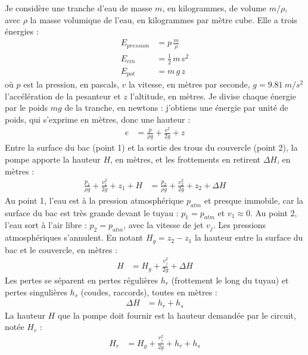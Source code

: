 \begin{demonstration}
Je considère une tranche d'eau de masse $m$, en kilogrammes, de volume $m/\rho$, avec $\rho$ la masse volumique de l'eau, en kilogrammes par mètre cube. Elle a trois énergies :
\begin{align*}
E_{pression} &= p\,\frac{m}{\rho}\\
E_{cin} &= \frac{1}{2}\,m\,v^2\\
E_{pot} &= m\,g\,z
\end{align*}
où $p$ est la pression, en pascals, $v$ la vitesse, en mètres par seconde, $g = \qty{9,81}{m/s^2}$ l'accélération de la pesanteur et $z$ l'altitude, en mètres. Je divise chaque énergie par le poids $m g$ de la tranche, en newtons : j'obtiens une énergie par unité de poids, qui s'exprime en mètres, donc une hauteur :
\begin{align*}
e &= \frac{p}{\rho g} + \frac{v^2}{2g} + z
\end{align*}
Entre la surface du bac (point 1) et la sortie des trous du couvercle (point 2), la pompe apporte la hauteur $H$, en mètres, et les frottements en retirent $\Delta H$, en mètres :
\begin{align*}
\frac{p_1}{\rho g} + \frac{v_1^2}{2g} + z_1 + H &= \frac{p_2}{\rho g} + \frac{v_2^2}{2g} + z_2 + \Delta H
\end{align*}
Au point 1, l'eau est à la pression atmosphérique $p_{atm}$ et presque immobile, car la surface du bac est très grande devant le tuyau : $p_1 = p_{atm}$ et $v_1 \approx 0$. Au point 2, l'eau sort à l'air libre : $p_2 = p_{atm}$, avec la vitesse de jet $v_j$. Les pressions atmosphériques s'annulent. En notant $H_g = z_2 - z_1$ la hauteur entre la surface du bac et le couvercle, en mètres :
\begin{align*}
H &= H_g + \frac{v_j^2}{2g} + \Delta H
\end{align*}
Les pertes se séparent en pertes régulières $h_r$ (frottement le long du tuyau) et pertes singulières $h_s$ (coudes, raccords), toutes en mètres :
\begin{align*}
\Delta H &= h_r + h_s
\end{align*}
La hauteur $H$ que la pompe doit fournir est la hauteur demandée par le circuit, notée $H_r$ :
\begin{align*}
H_r &= H_g + \frac{v_j^2}{2g} + h_r + h_s
\end{align*}
\end{demonstration}

